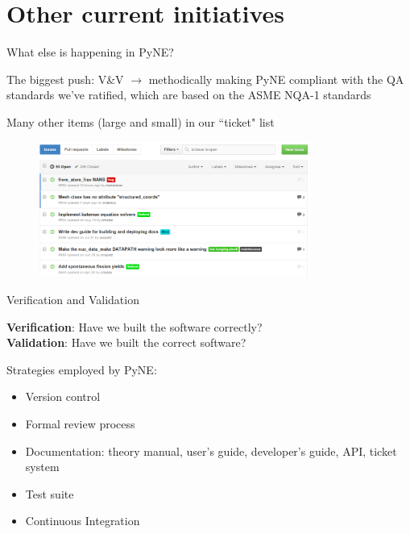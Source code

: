 \documentclass[xcolor=x11names,compress]{beamer}
\renewcommand{\(}{\begin{columns}}
\renewcommand{\)}{\end{columns}}
\newcommand{\<}[1]{\begin{column}{#1}}
\renewcommand{\>}{\end{column}}
\begin{document}
\section{Other current initiatives}
\begin{frame}{What else is happening in PyNE?}

    The biggest push: \alert{V\&V} $\rightarrow$ methodically making PyNE compliant
    with the QA standards we've ratified, which are based on the ASME NQA-1 standards
    \cite{pyne_vnv}

    \vspace*{1 em}
    Many other items (large and small) in our ``ticket" list

    \begin{center}
 	\begin{figure}
 	\includegraphics[height=1.75in,clip]{../figs/PyNE-tickets}
    \end{figure}
 	\end{center}

\end{frame}

\begin{frame}{Verification and Validation}

    \textbf{Verification}: Have we built the software correctly?\\
    \textbf{Validation}: Have we built the correct software?

    \vspace*{1 em}
    Strategies employed by PyNE:

    \begin{itemize}
      \item Version control
      \item Formal review process
      \item Documentation: theory manual, user's guide, developer's guide, API,
      ticket system
      \item Test suite
      \item Continuous Integration
    \end{itemize}

\end{frame}
\end{document}
